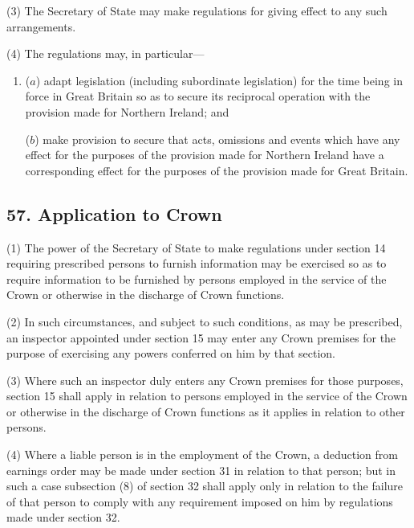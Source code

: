 \documentclass[12pt,a4paper]{article}
\begin{document}
(3) The Secretary of State may make regulations for giving effect to any such arrangements.

(4) The regulations may, in particular—
\begin{enumerate}\item[]
($a$) adapt legislation (including subordinate legislation) for the time being in force in Great Britain so as to secure its reciprocal operation with the provision made for Northern Ireland; and

($b$) make provision to secure that acts, omissions and events which have any effect for the purposes of the provision made for Northern Ireland have a corresponding effect for the purposes of the provision made for Great Britain.
\end{enumerate}


\subsection{57. Application to Crown}

(1) The power of the Secretary of State to make regulations under section 14 requiring prescribed persons to furnish information may be exercised so as to require information to be furnished by persons employed in the service of the Crown or otherwise in the discharge of Crown functions.

(2) In such circumstances, and subject to such conditions, as may be prescribed, an inspector appointed under section 15 may enter any Crown premises for the purpose of exercising any powers conferred on him by that section.

(3) Where such an inspector duly enters any Crown premises for those purposes, section 15 shall apply in relation to persons employed in the service of the Crown or otherwise in the discharge of Crown functions as it applies in relation to other persons.

(4) Where a liable person is in the employment of the Crown, a deduction from earnings order may be made under section 31 in relation to that person; but in such a case subsection (8)  of section 32 shall apply only in relation to the failure of that person to comply with any requirement imposed on him by regulations made under section 32.
\end{document}
